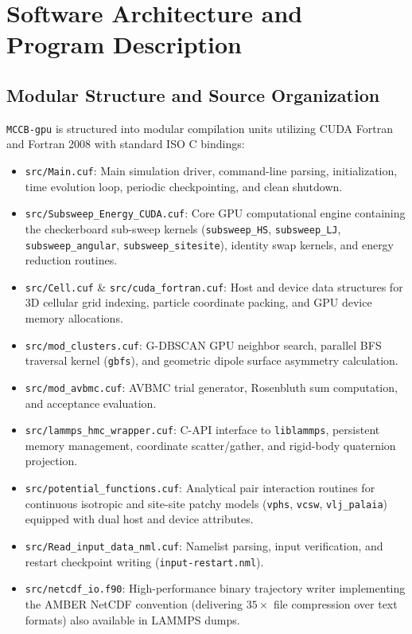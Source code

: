 \documentclass[final,5p,times,twocolumn]{elsarticle}
\begin{document}
\section{Software Architecture and Program Description}
\label{sec:software}

\subsection{Modular Structure and Source Organization}
\label{sec:soft_arch}

\texttt{MCCB-gpu} is structured into modular compilation units
utilizing CUDA Fortran and Fortran 2008 with standard ISO C bindings: 
\begin{itemize}
    \item \texttt{src/Main.cuf}: Main simulation driver, command-line
      parsing, initialization, time evolution loop, periodic
      checkpointing, and clean shutdown. 
    \item \texttt{src/Subsweep\_Energy\_CUDA.cuf}: Core GPU
      computational engine containing the checkerboard sub-sweep
      kernels (\texttt{subsweep\_HS}, \texttt{subsweep\_LJ},
      \texttt{subsweep\_angular}, \texttt{subsweep\_sitesite}),
      identity swap kernels, and energy reduction routines. 
    \item \texttt{src/Cell.cuf} \& \texttt{src/cuda\_fortran.cuf}:
      Host and device data structures for 3D cellular grid indexing,
      particle coordinate packing, and GPU device memory allocations. 
    \item \texttt{src/mod\_clusters.cuf}: G-DBSCAN GPU neighbor
      search, parallel BFS traversal kernel (\texttt{gbfs}), and
      geometric dipole surface asymmetry calculation. 
    \item \texttt{src/mod\_avbmc.cuf}: AVBMC trial generator,
      Rosenbluth sum computation, and acceptance evaluation. 
    \item \texttt{src/lammps\_hmc\_wrapper.cuf}: C-API interface to
      \texttt{liblammps}, persistent memory management, coordinate
      scatter/gather, and rigid-body quaternion projection. 
    \item \texttt{src/potential\_functions.cuf}: Analytical pair interaction routines for continuous isotropic and site-site patchy models (\texttt{vphs}, \texttt{vcsw}, \texttt{vlj\_palaia}) equipped with dual host and device attributes.
    \item \texttt{src/Read\_input\_data\_nml.cuf}: Namelist parsing,
      input verification, and restart checkpoint writing
      (\texttt{input-restart.nml}). 
    \item \texttt{src/netcdf\_io.f90}: High-performance binary
      trajectory writer implementing the AMBER NetCDF convention
      (delivering $35\times$ file compression over text formats) also
      available in LAMMPS dumps. 
\end{itemize}
\end{document}
